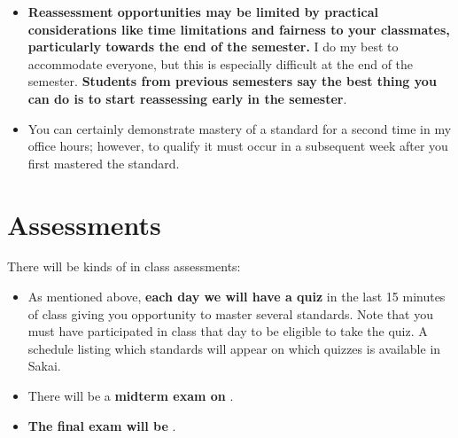 \documentclass[letterpaper]{article}
\begin{document}
\begin{enumerate}[1)]
\begin{itemize}
\item \textbf{Reassessment opportunities may be limited by practical considerations like time limitations and fairness to your classmates, particularly towards the end of the semester.}  I do my best to accommodate everyone, but this is especially difficult at the end of the semester.  {\bf Students from previous semesters say the best thing you can do is to start reassessing early in the semester}.
\item You can certainly demonstrate mastery of a standard for a second time in my office hours; however, to qualify it must occur in a subsequent week after you first mastered the standard.
\end{itemize}
\end{enumerate}




\section*{\fontsize{12}{15}\selectfont Assessments}
There will be  kinds of in class assessments:
\begin{itemize}
\item As mentioned above, {\bf each day we will have a quiz} in the last 15 minutes of class giving you opportunity to master several standards.  Note that you must have participated in class that day to be eligible to take the quiz.  A schedule listing which standards will appear on which quizzes is available in Sakai.
\item There will be a {\bf midterm exam on }.
\item {\bf The final exam will be }.
\end{itemize}
\end{document}
